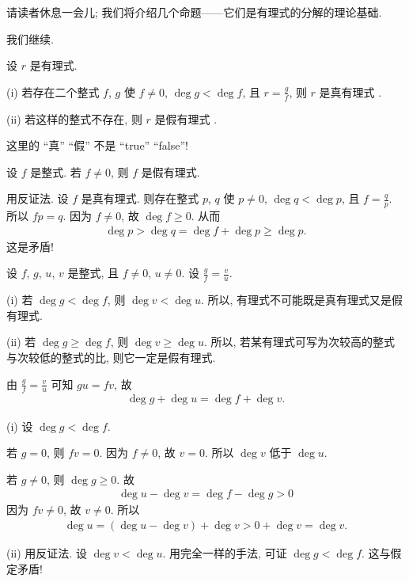请读者休息一会儿; 我们将介绍几个命题——它们是有理式的分解的理论基础.

\myLine

我们继续.

\begin{definition}
    设 $r$ 是有理式.

    (i) 若存在二个整式 $f$, $g$ 使 $f \neq 0$, $\deg g < \deg f$, 且 $r = \frac{g}{f}$, 则 $r$ 是真有理式 .

    (ii) 若这样的整式不存在, 则 $r$ 是假有理式 .
\end{definition}

\begin{remark}
    这里的 ``真'' ``假'' 不是 ``true'' ``false''!
\end{remark}

\begin{example}
    设 $f$ 是整式. 若 $f \neq 0$, 则 $f$ 是假有理式.

    用反证法. 设 $f$ 是真有理式. 则存在整式 $p$, $q$ 使 $p \neq 0$, $\deg q < \deg p$, 且 $f = \frac{q}{p}$. 所以 $fp = q$. 因为 $f \neq 0$, 故 $\deg f \geq 0$. 从而
    \begin{align*}
        \deg p > \deg q = \deg f + \deg p \geq \deg p.
    \end{align*}
    这是矛盾!
\end{example}

\begin{proposition}
    设 $f$, $g$, $u$, $v$ 是整式, 且 $f \neq 0$, $u \neq 0$. 设 $\frac{g}{f} = \frac{v}{u}$.

    (i) 若 $\deg g < \deg f$, 则 $\deg v < \deg u$. 所以, 有理式不可能既是真有理式又是假有理式.

    (ii) 若 $\deg g \geq \deg f$, 则 $\deg v \geq \deg u$. 所以, 若某有理式可写为次较高的整式与次较低的整式的比, 则它一定是假有理式.
\end{proposition}

\begin{pf}
    由 $\frac{g}{f} = \frac{v}{u}$ 可知 $gu = fv$, 故
    \begin{align*}
        \deg g + \deg u = \deg f + \deg v.
    \end{align*}

    (i) 设 $\deg g < \deg f$.

    若 $g = 0$, 则 $fv = 0$. 因为 $f \neq 0$, 故 $v = 0$. 所以 $\deg v$ 低于 $\deg u$.

    若 $g \neq 0$, 则 $\deg g \geq 0$. 故
    \begin{align*}
        \deg u - \deg v = \deg f - \deg g > 0
    \end{align*}
    因为 $fv \neq 0$, 故 $v \neq 0$. 所以
    \begin{align*}
        \deg u = (\deg u - \deg v) + \deg v > 0 + \deg v = \deg v.
    \end{align*}

    (ii) 用反证法. 设 $\deg v < \deg u$. 用完全一样的手法, 可证 $\deg g < \deg f$. 这与假定矛盾!
\end{pf}

